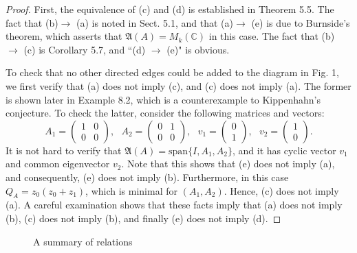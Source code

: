\documentclass[draft, 12pt, reqno]{amsart}
\newcommand{\C}{{\mathbb C}}
\numberwithin{equation}{section}
\theoremstyle{plain}
\begin{document}
\begin{proof}
First, the equivalence of (c) and (d) is established in Theorem 5.5. The fact that (b)$\to$ (a) is noted in Sect. 5.1, and that (a)$\to$ (e) is due to Burnside's theorem, which asserts that $\mathfrak{A}(A)=M_k(\C)$ in this case. The fact that (b) $\to$ (c) is Corollary 5.7, and ``(d) $\to$ (e)" is obvious.

To check that no other directed edges could be added to the diagram in Fig. 1, we first verify that (a) does not imply (c), and (c) does not imply (a). The former is shown later in Example 8.2, which is a counterexample to Kippenhahn's conjecture. To check the latter, consider the following matrices and vectors:
\[A_1=\begin{pmatrix} 1 & 0 \\ 0 & 0 \end{pmatrix},\ \ \ A_2=\begin{pmatrix} 0 & 1\\ 0 & 0 \end{pmatrix}, \ \ \ v_1=\begin{pmatrix} 0 \\ 1 \end{pmatrix},\ \ \ v_2=\begin{pmatrix} 1 \\ 0 \end{pmatrix}.\] It is not hard to verify that $\mathfrak{A}(A)=\text{span}\{I, A_1, A_2\}$, and it has cyclic vector $v_1$ and common eigenvector $v_2$. Note that this shows that (e) does not imply (a), and consequently, (e) does not imply (b). Furthermore, in this case $Q_A=z_0(z_0+z_1)$, which is minimal for $(A_1, A_2)$. Hence, (c) does not imply (a). A careful examination shows that these facts imply that (a) does not imply (b), (c) does not imply (b), and finally (e) does not imply (d).

\end{proof}

\begin{figure}[htbp]
    \centering
    \caption{A summary of relations}
\end{figure}
\end{document}
